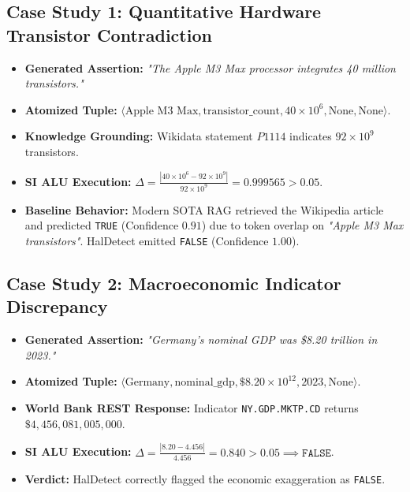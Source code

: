 \subsection{Case Study 1: Quantitative Hardware Transistor Contradiction}
\begin{itemize}
    \item \textbf{Generated Assertion:} \textit{"The Apple M3 Max processor integrates 40 million transistors."}
    \item \textbf{Atomized Tuple:} $\langle \text{Apple M3 Max}, \text{transistor\_count}, 40\times 10^6, \text{None}, \text{None} \rangle$.
    \item \textbf{Knowledge Grounding:} Wikidata statement $P1114$ indicates $92\times 10^9$ transistors.
    \item \textbf{SI ALU Execution:} $\Delta = \frac{|40\times 10^6 - 92\times 10^9|}{92\times 10^9} = 0.999565 > 0.05$.
    \item \textbf{Baseline Behavior:} Modern SOTA RAG retrieved the Wikipedia article and predicted \texttt{TRUE} (Confidence $0.91$) due to token overlap on \textit{"Apple M3 Max transistors"}. HalDetect emitted \texttt{FALSE} (Confidence $1.00$).
\end{itemize}

\subsection{Case Study 2: Macroeconomic Indicator Discrepancy}
\begin{itemize}
    \item \textbf{Generated Assertion:} \textit{"Germany's nominal GDP was \$8.20 trillion in 2023."}
    \item \textbf{Atomized Tuple:} $\langle \text{Germany}, \text{nominal\_gdp}, \$8.20\times 10^{12}, 2023, \text{None} \rangle$.
    \item \textbf{World Bank REST Response:} Indicator \texttt{NY.GDP.MKTP.CD} returns $\$4,456,081{,}005,000$.
    \item \textbf{SI ALU Execution:} $\Delta = \frac{|8.20 - 4.456|}{4.456} = 0.840 > 0.05 \implies \texttt{FALSE}$.
    \item \textbf{Verdict:} HalDetect correctly flagged the economic exaggeration as \texttt{FALSE}.
\end{itemize}

